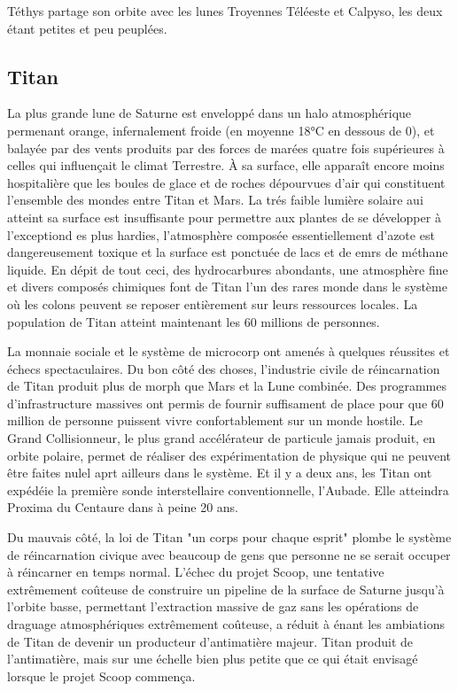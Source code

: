 Téthys partage son orbite avec les lunes Troyennes Téléeste et Calpyso, les deux étant petites et peu peuplées. 

\subsection{Titan} \label{sec:titan} 

La plus grande lune de Saturne est enveloppé dans un halo atmosphérique permenant orange, infernalement froide (en moyenne 18°C en dessous de 0), et balayée par des vents produits par des forces de marées quatre fois supérieures à celles qui influençait le climat Terrestre. À sa surface, elle apparaît encore moins hospitalière que les boules de glace et de roches dépourvues d'air qui constituent l'ensemble des mondes entre Titan et Mars. La trés faible lumière solaire aui atteint sa surface est insuffisante pour permettre aux plantes de se développer à l'exceptiond es plus hardies, l'atmosphère composée essentiellement d'azote est dangereusement toxique et la surface est ponctuée de lacs et de emrs de méthane liquide. En dépit de tout ceci, des hydrocarbures abondants, une atmosphère fine et divers composés chimiques font de Titan l'un des rares monde dans le système où les colons peuvent se reposer entièrement sur leurs ressources locales. La population de Titan atteint maintenant les 60 millions de personnes. 

La monnaie sociale et le système de microcorp ont amenés à quelques réussites et échecs spectaculaires. Du bon côté des choses, l'industrie civile de réincarnation de Titan produit plus de morph que Mars et la Lune combinée. Des programmes d'infrastructure massives ont permis de fournir suffisament de place pour que 60 million de personne puissent vivre confortablement sur un monde hostile. Le Grand Collisionneur, le plus grand accélérateur de particule jamais produit, en orbite polaire, permet de réaliser des expérimentation de physique qui ne peuvent être faites nulel aprt ailleurs dans le système. Et il y a deux ans, les Titan ont expédéie la première sonde interstellaire conventionnelle, l'Aubade. Elle atteindra Proxima du Centaure dans à peine 20 ans. 

Du mauvais côté, la loi de Titan "un corps pour chaque esprit" plombe le système de réincarnation civique avec beaucoup de gens que personne ne se serait occuper à réincarner en temps normal. L'échec du projet Scoop, une tentative extrêmement coûteuse de construire un pipeline de la surface de Saturne jusqu'à l'orbite basse, permettant l'extraction massive de gaz sans les opérations de draguage atmosphériques extrêmement coûteuse, a réduit à énant les ambiations de Titan de devenir un producteur d'antimatière majeur. Titan produit de l'antimatière, mais sur une échelle bien plus petite que ce qui était envisagé lorsque le projet Scoop commença. 

